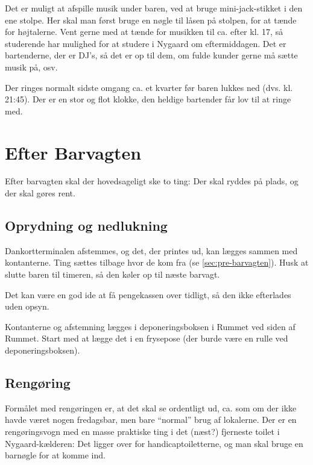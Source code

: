Det er muligt at afspille musik under baren, ved at bruge
mini-jack-stikket i den ene stolpe. Her skal man først bruge en nøgle
til låsen på stolpen, for at tænde for højtalerne. Vent gerne med at
tænde for musikken til ca. efter kl. 17, så studerende har mulighed
for at studere i Nygaard om eftermiddagen. Det er bartenderne, der er
DJ's, så det er op til dem, om fulde kunder gerne må sætte musik på,
osv.

Der ringes normalt sidste omgang ca. et kvarter før baren lukkes ned
(dvs. kl. 21:45). Der er en stor og flot klokke, den heldige bartender
får lov til at ringe med.

\section{Efter Barvagten}
\label{sec:post-barvagten}

Efter barvagten skal der hovedsageligt ske to ting: Der skal ryddes på
plads, og der skal gøres rent.

\subsection{Oprydning og nedlukning}
\label{sec:post:oprydning}

Dankortterminalen afstemmes, og det, der printes ud, kan lægges sammen
med kontanterne. Ting sættes tilbage hvor de kom fra (se
\autoref{sec:pre-barvagten}). Husk at slutte baren til timeren, så den
køler op til næste barvagt.

Det kan være en god ide at få
pengekassen over tidligt, så den ikke efterlades uden opsyn.

Kontanterne og afstemning lægges i deponeringsboksen i Rummet ved
siden af Rummet. Start med at lægge det i en frysepose (der burde være
en rulle ved deponeringsboksen).

\subsection{Rengøring}
\label{sec:post:rengoring}

Formålet med rengøringen er, at det skal se ordentligt ud, ca. som om
der ikke havde været nogen fredagsbar, men bare ``normal'' brug af
lokalerne. Der er en rengøringsvogn med en masse praktiske ting i det
(næst?) fjerneste toilet i Nygaard-kælderen: Det ligger over for
handicaptoiletterne, og man skal bruge en barnøgle for at komme ind.

